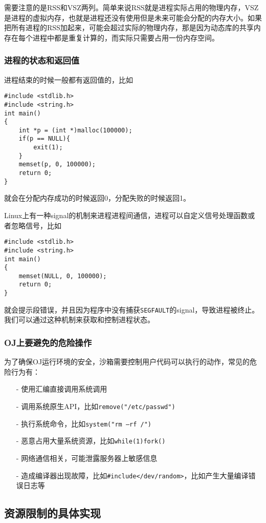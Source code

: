 需要注意的是RSS和VSZ两列。简单来说RSS就是进程实际占用的物理内存，VSZ是进程的虚拟内存，也就是进程还没有使用但是未来可能会分配的内存大小。如果把所有进程的RSS加起来，可能会超过实际的物理内存，那是因为动态库的共享内存在每个进程中都是重复计算的，而实际只需要占用一份内存空间。

\subsubsection{进程的状态和返回值}
进程结束的时候一般都有返回值的，比如

\begin{verbatim}
#include <stdlib.h>
#include <string.h>
int main()
{
    int *p = (int *)malloc(100000);
    if(p == NULL){
        exit(1);
    }
    memset(p, 0, 100000);
    return 0;
}
\end{verbatim}就会在分配内存成功的时候返回0，分配失败的时候返回1。

Linux上有一种signal的机制来进程进程间通信，进程可以自定义信号处理函数或者忽略信号，比如

\begin{verbatim}
#include <stdlib.h>
#include <string.h>
int main()
{
    memset(NULL, 0, 100000);
    return 0;
}
\end{verbatim}就会提示段错误，并且因为程序中没有捕获\texttt{SEGFAULT}的signal，导致进程被终止。我们可以通过这种机制来获取和控制进程状态。

\subsubsection{OJ上要避免的危险操作}

为了确保OJ运行环境的安全，沙箱需要控制用户代码可以执行的动作，常见的危险行为有：
\begin{itemize}
\item[-]使用汇编直接调用系统调用
\item[-]调用系统原生API，比如\texttt{remove("/etc/passwd")}
\item[-]执行系统命令，比如\texttt{system("rm –rf /")}
\item[-]恶意占用大量系统资源，比如\texttt{while(1){fork()}}
\item[-]网络通信相关，可能泄露服务器上敏感信息
\item[-]造成编译器出现故障，比如\texttt{\#include</dev/random>}，比如产生大量编译错误日志等
\end{itemize}

\subsection{资源限制的具体实现}
